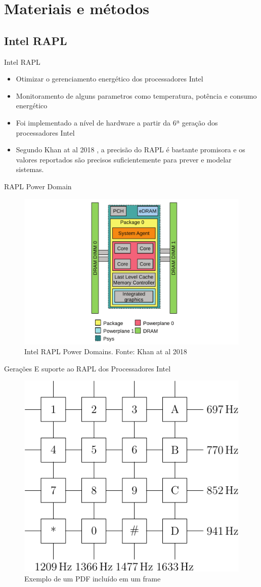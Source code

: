 \section{Materiais e métodos}

\subsection{Intel RAPL}
\begin{frame}{Intel RAPL}
    \begin{itemize}
        \item Otimizar o gerenciamento energético dos processadores Intel
        \item Monitoramento de alguns parametros como temperatura, potência e consumo energético
        \item Foi implementado a nível de hardware a partir da 6ª geração dos processadores Intel
        \item Segundo Khan at al 2018 \cite{khan2018IntelRapl}, a precisão do RAPL é bastante promisora e os valores reportados são precisos suficientemente para prever e modelar sistemas.
    \end{itemize}
\end{frame}

\begin{frame}{RAPL Power Domain}
    \begin{figure}
        \centering
        \includegraphics[width=0.61\linewidth]{images/powerDomainsRAPL.png}
        \caption{Intel RAPL Power Domains. Fonte: Khan at al 2018 \cite{khan2018IntelRapl}}
        \label{fig:powerDomains}
    \end{figure}
\end{frame}

\begin{frame}{Gerações E suporte ao RAPL dos Processadores Intel}
        \begin{figure}
            \centering
            \includegraphics[width=0.35\linewidth]{images/dtmf.pdf}
            \caption{Exemplo de um PDF incluído em um frame}
            \label{fig:example}
        \end{figure}
\end{frame}

